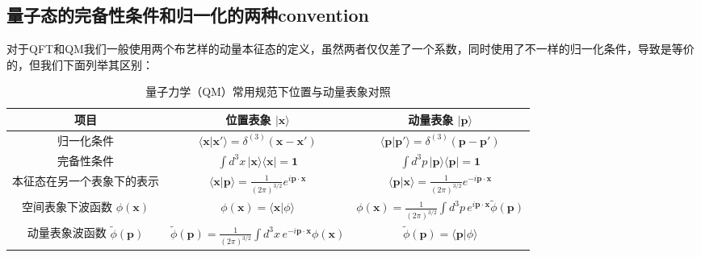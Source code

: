 \subsection{量子态的完备性条件和归一化的两种convention}

对于QFT和QM我们一般使用两个布艺样的动量本征态的定义，虽然两者仅仅差了一个系数，同时使用了不一样的归一化条件，导致是等价的，但我们下面列举其区别：

\bigskip
{}

\begin{table}[H]
  \centering
  \begin{tabular}{ccc}
    \toprule
    \textbf{项目} & \textbf{位置表象 $|\mathbf{x}\rangle$} & \textbf{动量表象
    $|\mathbf{p}\rangle$} \\
    \midrule
    归一化条件 &
    $\langle \mathbf{x}|\mathbf{x}'\rangle =
    \delta^{(3)}(\mathbf{x}-\mathbf{x}')$ &
    $\langle \mathbf{p}|\mathbf{p}'\rangle =
    \delta^{(3)}(\mathbf{p}-\mathbf{p}')$ \\
    完备性条件 &
    $\displaystyle \int d^3x\,|\mathbf{x}\rangle\langle \mathbf{x}| =
    \mathbf{1}$ &
    $\displaystyle \int d^3p\,|\mathbf{p}\rangle\langle \mathbf{p}| =
    \mathbf{1}$ \\
    本征态在另一个表象下的表示 &
    $\langle \mathbf{x}|\mathbf{p}\rangle = \frac{1}{(2\pi)^{3/2}}
    e^{i\mathbf{p}\cdot\mathbf{x}}$ &
    $\langle \mathbf{p}|\mathbf{x}\rangle = \frac{1}{(2\pi)^{3/2}}
    e^{-i\mathbf{p}\cdot\mathbf{x}}$ \\
    空间表象下波函数 $\phi(\mathbf{x})$ &
    $\phi(\mathbf{x}) = \langle \mathbf{x}|\phi\rangle$ &
    $\phi(\mathbf{x}) = \frac{1}{(2\pi)^{3/2}}\int d^3p\,
    e^{i\mathbf{p}\cdot\mathbf{x}} \tilde{\phi}(\mathbf{p})$ \\
    动量表象波函数 $\tilde{\phi}(\mathbf{p})$ &
    $\tilde{\phi}(\mathbf{p}) = \frac{1}{(2\pi)^{3/2}} \int d^3x\,
    e^{-i\mathbf{p}\cdot \mathbf{x}} \phi(\mathbf{x})$ &
    $\tilde{\phi}(\mathbf{p}) = \langle \mathbf{p}|\phi\rangle$ \\
    \bottomrule
  \end{tabular}
  \caption{量子力学（QM）常用规范下位置与动量表象对照}
\end{table}

\bigskip
{}

